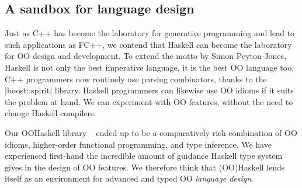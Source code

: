 


\subsection{A sandbox for language design}

Just as C++ has become the laboratory for generative programming
\cite{DSL-in-three-lang} and lead to such applications as FC++, we
contend that Haskell can become the laboratory for OO design and
development.  To extend the motto by Simon Peyton-Jones, Haskell is
not only the best imperative language, it is the best OO language too.
C++ programmers now routinely use parsing combinators, thanks to the
|boost::spirit| library. Haskell programmers can likewise use OO
idioms if it suits the problem at hand. We can experiment with OO
features, without the need to change Haskell compilers.

Our OOHaskell library ~\cite{OOHaskell} ended up to be a comparatively rich
combination of OO idioms, higher-order functional programming, and
type inference.  We have experienced first-hand the incredible amount
of guidance Haskell type system gives in the design of OO features.
We therefore think that (OO)Haskell lends itself as an environment for
advanced and typed OO \emph{language design}.
